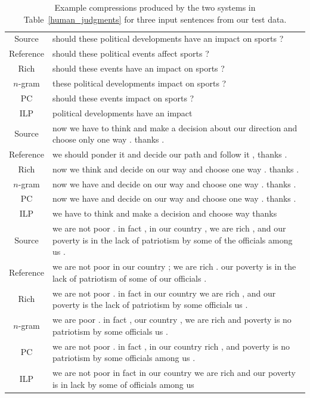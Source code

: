 \documentclass[11pt]{article}
\begin{document}
\begin{table}[!th]
\begin{center}
\small
{
\renewcommand{\arraystretch}{1.5}
\begin{tabular}{|c|>{\raggedright}m{13.2cm}|}
  \hline

  Source & should these political developments have an impact on sports
  ? \tabularnewline
  Reference & should these political events affect sports ? \tabularnewline
  \hline
  Rich & should these events have an impact on sports ? \tabularnewline
  \hline
  $n$-gram & these political developments impact on sports ? \tabularnewline
  \hline
  PC & should these events impact on sports ? \tabularnewline
  \hline
  ILP & political developments have an impact \tabularnewline
  \hline
  \hline

  Source & now we have to think and make a decision about our direction
  and choose only one way . thanks . \tabularnewline
  \hline
  Reference & we should ponder it and decide our path and follow it , thanks
  . \tabularnewline
  \hline
  Rich & now we think and decide on our way and choose one way . thanks
  . \tabularnewline
  \hline
  $n$-gram & now we have and decide on our way and choose one way . thanks
  . \tabularnewline
  \hline
  PC & now we have and decide on our way and choose one way . thanks
  . \tabularnewline
  \hline
  ILP &  we have to think and make a decision and choose way thanks
  \tabularnewline
  \hline
  \hline

  Source &  we are not poor . in fact , in our country , we are rich , and
  our poverty is in the lack of patriotism by some of the officials
  among us . \tabularnewline
  \hline
  Reference &  we are not poor in our country ; we are rich . our poverty is
  in the lack of patriotism of some of our officials . \tabularnewline
  \hline
  Rich & we are not poor . in fact in our country we are rich , and our
  poverty is the lack of patriotism by some officials us
  . \tabularnewline
  \hline
  $n$-gram & we are poor . in fact , our country , we are rich and
  poverty is no patriotism by some officials us . \tabularnewline
  \hline
  PC & we are not poor . in fact , in our country rich , and poverty
  is no patriotism by some officials among us . \tabularnewline
  \hline
  ILP & we are not poor in fact in our country we are rich and our
  poverty is in lack by some of officials among us \tabularnewline
  \hline
\end{tabular}
}
\normalsize
\end{center}
\caption{Example compressions produced by the two systems in
  Table~\ref{human_judgments} for three input sentences from our test
  data.}
\label{test_examples}
\end{table}
\end{document}
